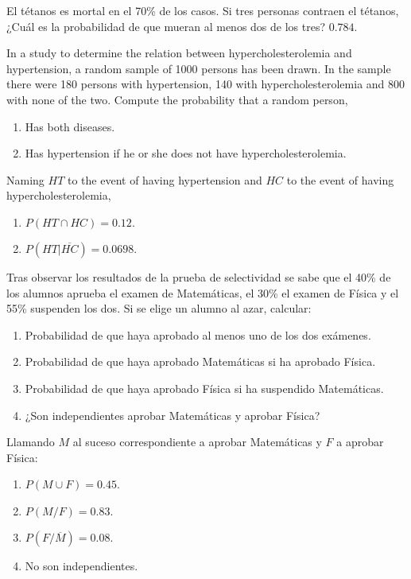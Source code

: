 {El tétanos es mortal en el 70\% de los casos.
Si tres personas contraen el tétanos, ¿Cuál es la probabilidad de que mueran al menos dos de los tres?
}
{$0.784$.}
{}


{In a study to determine the relation between hypercholesterolemia and hypertension, a random sample of 1000 persons has been drawn.
In the sample there were 180 persons with hypertension, 140 with hypercholesterolemia and 800 with none of the two. 
Compute the probability that a random person, 
\begin{enumerate}
\item Has both diseases. 
\item Has hypertension if he or she does not have hypercholesterolemia.
\end{enumerate}
}
{Naming $HT$ to the event of having hypertension and $HC$ to the event of having hypercholesterolemia,
\begin{enumerate}
\item $P(HT\cap HC)=0.12.$
\item $P(HT|\overline{HC})=0.0698.$
\end{enumerate} 
}
{}


{Tras observar los resultados de la prueba de selectividad se sabe que el 40\% de los alumnos aprueba el examen de
Matemáticas, el 30\% el examen de Física y el 55\% suspenden los dos.
Si se elige un alumno al azar, calcular:
\begin{enumerate}
\item Probabilidad de que haya aprobado al menos uno de los dos exámenes.
\item Probabilidad de que haya aprobado Matemáticas si ha aprobado Física.
\item Probabilidad de que haya aprobado Física si ha suspendido Matemáticas.
\item ¿Son independientes aprobar Matemáticas y aprobar Física?
\end{enumerate}
}
{Llamando $M$ al suceso correspondiente a aprobar Matemáticas y $F$ a aprobar Física:
\begin{enumerate}
\item $P(M\cup F)=0.45$.
\item $P(M/F)=0.83$.
\item $P(F/\overline{M})=0.08$.
\item No son independientes.
\end{enumerate}
}
{}


